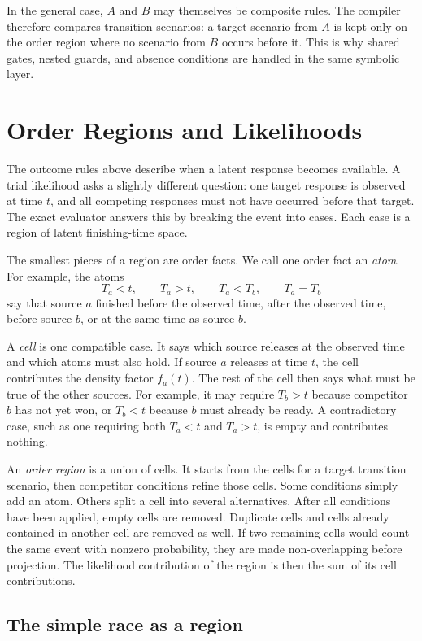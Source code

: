 \documentclass[11pt]{article}
\begin{document}
In the general case, $A$ and $B$ may themselves be composite rules. The compiler
therefore compares transition scenarios: a target scenario from $A$ is kept
only on the order region where no scenario from $B$ occurs before it. This is
why shared gates, nested guards, and absence conditions are handled in the same
symbolic layer.

\section{Order Regions and Likelihoods}

The outcome rules above describe when a latent response becomes available. A
trial likelihood asks a slightly different question: one target response is
observed at time $t$, and all competing responses must not have occurred before
that target. The exact evaluator answers this by breaking the event into cases.
Each case is a region of latent finishing-time space.

The smallest pieces of a region are order facts. We call one order fact an
\emph{atom}. For example, the atoms
\[
T_a < t, \qquad T_a > t, \qquad T_a < T_b, \qquad T_a = T_b
\]
say that source $a$ finished before the observed time, after the observed time,
before source $b$, or at the same time as source $b$.

A \emph{cell} is one compatible case. It says which source releases at the
observed time and which atoms must also hold. If source $a$ releases at time
$t$, the cell contributes the density factor $f_a(t)$. The rest of the cell
then says what must be true of the other sources. For example, it may require
$T_b>t$ because competitor $b$ has not yet won, or $T_b<t$ because $b$ must
already be ready. A contradictory case, such as one requiring both $T_a<t$ and
$T_a>t$, is empty and contributes nothing.

An \emph{order region} is a union of cells. It starts from the cells for a
target transition scenario, then competitor conditions refine those cells. Some
conditions simply add an atom. Others split a cell into several alternatives.
After all conditions have been applied, empty cells are removed. Duplicate cells
and cells already contained in another cell are removed as well. If two
remaining cells would count the same event with nonzero probability, they are
made non-overlapping before projection. The likelihood contribution of the
region is then the sum of its cell contributions.

\subsection{The simple race as a region}
\end{document}
